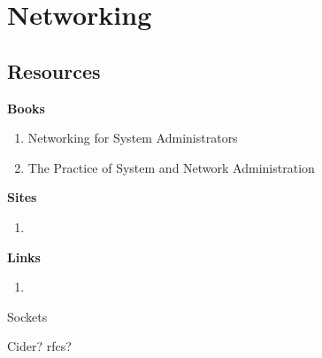 \chapter{Networking}
\section{Resources}
	\textbf{Books}
		\begin{enumerate}
			\item Networking for System Administrators
			\item The Practice of System and Network Administration
		\end{enumerate}
	\textbf{Sites}
		\begin{enumerate}
			\item
		\end{enumerate}
	\textbf{Links}
		\begin{enumerate}
			\item
		\end{enumerate}

	\begin{questions}{Sockets}
		\begin{questionAnswer}
		\end{questionAnswer}
	\end{questions}

Cider?
rfcs?
